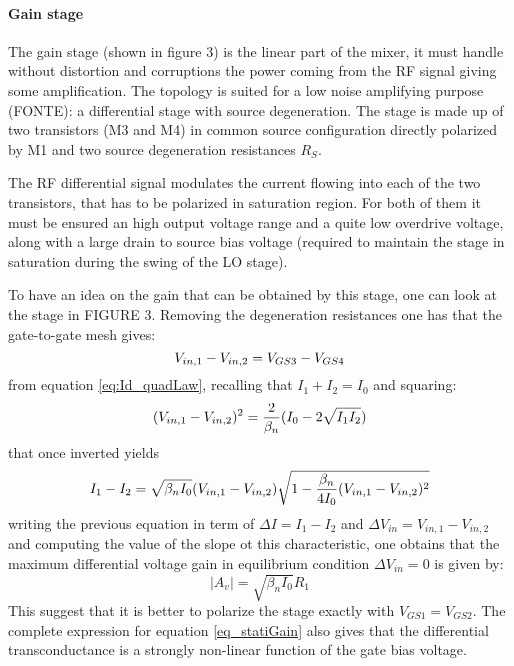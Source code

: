 \paragraph{Gain stage}

The gain stage (shown in figure 3) is the linear part of the mixer, it must handle without distortion and corruptions the power coming from the RF signal giving some amplification. The topology is suited for a low noise amplifying purpose (FONTE): a differential stage with source degeneration. The stage is made up of two transistors (M3 and M4) in common source configuration directly polarized by M1 and two source degeneration resistances $R_S$.

The RF differential signal modulates the current flowing into each of the two transistors, that has to be polarized in saturation region. For both of them it must be ensured an high output voltage range and a quite low overdrive voltage, along with a large drain to source bias voltage (required to maintain the stage in saturation during the swing of the LO stage).

To have an idea on the gain that can be obtained by this stage, one can look at the stage in FIGURE 3. Removing the degeneration resistances one has that the gate-to-gate mesh gives:
\begin{equation}
V_{in,1}-V_{in,2} = V_{GS3}-V_{GS4} \notag
\end{equation} 
from equation \ref{eq:Id_quadLaw}, recalling that $I_{1}+I_{2}=I_0$ and squaring:
\begin{equation}
(V_{in,1}-V_{in,2})^2 = \frac{2}{\beta_n}(I_0-2\sqrt{I_1 I_2}) \notag
\end{equation}
that once inverted yields
\begin{equation}
I_{1}-I_{2} = \sqrt{\beta_n I_0}(V_{in,1}-V_{in,2})\sqrt{1-\frac{\beta_n}{4I_0}(V_{in,1}-V_{in,2})^2} \notag
\end{equation}
writing the previous equation in term of $\Delta I =I_{1}-I_{2} $ and $\Delta V_{in} = V_{in,1}-V_{in,2}$ and computing the value of the slope ot this characteristic, one obtains that the maximum differential voltage gain in equilibrium condition $\Delta V_{in} =0$ is given by:
\begin{equation}
\label{eq_statiGain}
|A_{v}|= \sqrt{\beta_{n}I_0}R_1
\end{equation}
This suggest that it is better to polarize the stage exactly with  $V_{GS1}=V_{GS2}$. The complete expression for equation \ref{eq_statiGain} also gives that the differential transconductance is a strongly non-linear function of the gate bias voltage. 

